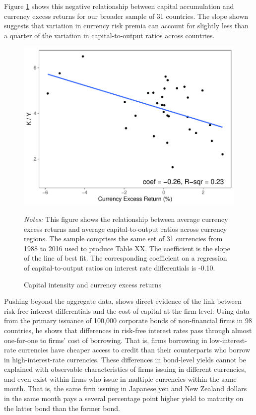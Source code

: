 \documentclass{ar-1col}
\begin{document}
Figure \ref{fig:ky_rx} shows this negative relationship between capital accumulation and currency excess returns for our broader sample of 31 countries. The slope shown suggests that variation in currency risk premia can account for slightly less than a quarter of the variation in capital-to-output ratios across countries.
\begin{figure}[htp]
    \centering
    \caption{Capital intensity and currency excess returns}
    \label{fig:ky_rx}
    \includegraphics[width=0.7\linewidth]{Exhibits/Figure_KY_RX.pdf}
    \begin{minipage}[htp]{\textwidth}
    \scriptsize 
    \emph{Notes:} This figure shows the relationship between average currency excess returns and average capital-to-output ratios across currency regions. The sample comprises the same set of 31 currencies from 1988 to 2016 used to produce Table XX. The coefficient is the slope of the line of best fit. The corresponding coefficient on a regression of capital-to-output ratios on interest rate differentials is -0.10.
    \end{minipage}
\end{figure}

Pushing beyond the aggregate data, \citet{Richers2020} shows direct evidence of the link between  risk-free interest differentials and the cost of capital at the firm-level: Using data from the primary issuance of 100,000 corporate bonds of non-financial firms in 98 countries, he shows that differences in risk-free interest rates pass through almost one-for-one to firms' cost of borrowing. That is, firms borrowing in low-interest-rate currencies have cheaper access to credit than their counterparts who borrow in high-interest-rate currencies. These differences in bond-level yields cannot be explained with observable characteristics of firms issuing in different currencies, and even exist within firms who issue in multiple currencies within the same month. That is, the same firm issuing in Japanese yen and New Zealand dollars in the same month pays a several percentage point higher yield to maturity on the latter bond than the former bond. 
\end{document}
